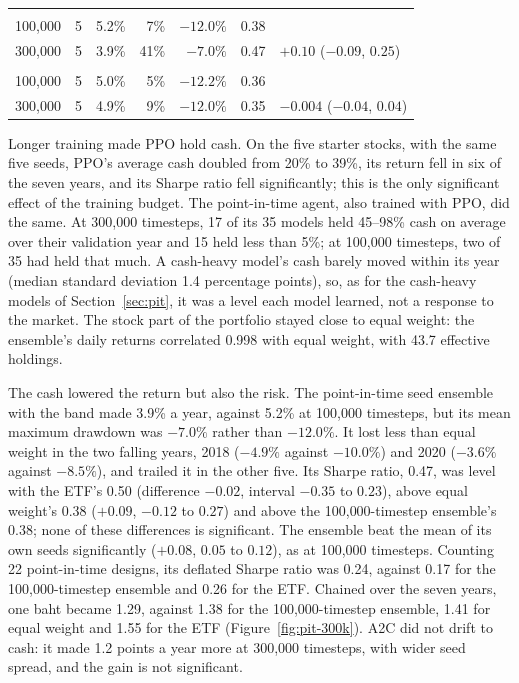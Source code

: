 \begin{table}[H]
\begin{tabularx}{\textwidth}{@{}Yrrrrrl@{}}
\addlinespace
{} \\
100{,}000 & 5 & 5.2\% & 7\% & $-12.0\%$ & 0.38 & \\
300{,}000 & 5 & 3.9\% & 41\% & $-7.0\%$ & 0.47 & $+0.10$ ($-0.09$, $0.25$) \\
\addlinespace
{} \\
100{,}000 & 5 & 5.0\% & 5\% & $-12.2\%$ & 0.36 & \\
300{,}000 & 5 & 4.9\% & 9\% & $-12.0\%$ & 0.35 & $-0.004$ ($-0.04$, $0.04$) \\
\bottomrule
\end{tabularx}
\end{table}

Longer training made PPO hold cash. On the five starter stocks, with the same five seeds, PPO's average
cash doubled from 20\% to 39\%, its return fell in six of the seven years, and its Sharpe ratio fell
significantly; this is the only significant effect of the training budget. The point-in-time agent,
also trained with PPO, did the same. At 300{,}000 timesteps, 17 of its 35 models held 45--98\% cash on
average over their validation year and 15 held less than 5\%; at 100{,}000 timesteps, two of 35 had held
that much. A cash-heavy model's cash barely moved within its year (median standard deviation 1.4
percentage points), so, as for the cash-heavy models of Section~\ref{sec:pit}, it was a level each model
learned, not a response to the market. The stock part of the portfolio stayed close to equal weight: the
ensemble's daily returns correlated 0.998 with equal weight, with 43.7 effective holdings.

The cash lowered the return but also the risk. The point-in-time seed ensemble with the band made 3.9\%
a year, against 5.2\% at 100{,}000 timesteps, but its mean maximum drawdown was $-7.0\%$ rather than
$-12.0\%$. It lost less than equal weight in the two falling years, 2018 ($-4.9\%$ against $-10.0\%$) and
2020 ($-3.6\%$ against $-8.5\%$), and trailed it in the other five. Its Sharpe ratio, 0.47, was level with
the ETF's 0.50 (difference $-0.02$, interval $-0.35$ to $0.23$), above equal weight's 0.38 ($+0.09$, $-0.12$
to $0.27$) and above the 100{,}000-timestep ensemble's 0.38; none of these differences is significant. The
ensemble beat the mean of its own seeds significantly ($+0.08$, $0.05$ to $0.12$), as at 100{,}000
timesteps. Counting 22 point-in-time designs, its deflated Sharpe ratio was 0.24, against 0.17 for the
100{,}000-timestep ensemble and 0.26 for the ETF. Chained over the seven years, one baht became 1.29,
against 1.38 for the 100{,}000-timestep ensemble, 1.41 for equal weight and 1.55 for the ETF
(Figure~\ref{fig:pit-300k}). A2C did not drift to cash: it made 1.2 points a year more at 300{,}000
timesteps, with wider seed spread, and the gain is not significant.

